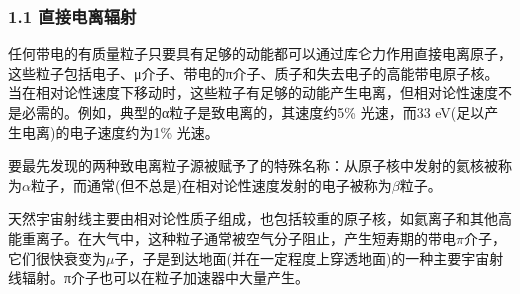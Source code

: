 \subsubsection{1.1 直接电离辐射}
任何带电的有质量粒子只要具有足够的动能都可以通过库仑力作用直接电离原子，这些粒子包括电子、μ介子、带电的π介子、质子和失去电子的高能带电原子核。当在相对论性速度下移动时，这些粒子有足够的动能产生电离，但相对论性速度不是必需的。例如，典型的α粒子是致电离的，其速度约5\% 光速，而33 eV(足以产生电离)的电子速度约为1\% 光速。

要最先发现的两种致电离粒子源被赋予了的特殊名称：从原子核中发射的氦核被称为$\alpha$粒子，而通常(但不总是)在相对论性速度发射的电子被称为$\beta$粒子。

天然宇宙射线主要由相对论性质子组成，也包括较重的原子核，如氦离子和其他高能重离子。在大气中，这种粒子通常被空气分子阻止，产生短寿期的带电$\pi$介子，它们很快衰变为$\mu$子，子是到达地面(并在一定程度上穿透地面)的一种主要宇宙射线辐射。π介子也可以在粒子加速器中大量产生。